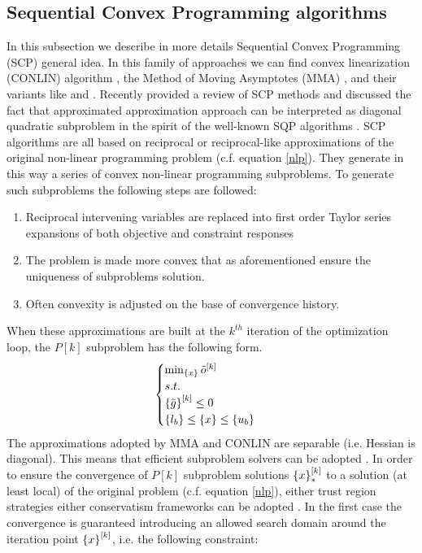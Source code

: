 \subsection{Sequential Convex Programming algorithms}
In this subsection we describe in more details Sequential Convex Programming (SCP) \cite{fleury1993mathematical,zillober2004very,duysinx2009solution} general idea. In this family of approaches we can find convex linearization (CONLIN) algorithm \cite{fleury1986structural}, the Method of Moving Asymptotes (MMA) \cite{svanberg1987method,svanberg2002class}, and their variants like \cite{borrvall2001large,bruyneel2002family} and \cite{zillober2004very}.
Recently \cite{etman2012first} provided a review of SCP methods and discussed the fact that approximated approximation approach \cite{groenwold2010approximated} can be interpreted as diagonal quadratic subproblem in the spirit of the well-known SQP algorithms \cite{nocedal2006sequential}.
SCP algorithms are all based on reciprocal or reciprocal-like approximations of the original non-linear programming problem (c.f. equation \eqref{nlp}). They generate in this way  a series of convex non-linear programming subproblems. To generate such subproblems the following steps are followed:
\begin{enumerate}
\item Reciprocal intervening variables are replaced into first order Taylor series expansions of both objective and constraint responses 
\item The problem is made more convex that as aforementioned ensure the uniqueness of subproblems solution.
\item Often convexity is adjusted on the base of convergence history.
\end{enumerate}
When these approximations are built at the $k^{th}$ iteration of the optimization loop, the $P[k]$ subproblem has the following form.
\begin{equation}
\begin{cases}
\min_{\left\lbrace{x}\right \rbrace} \tilde{o}^{[k]}\\
s.t.\\
\left\lbrace{\tilde{g}}\right \rbrace^{[k]}\leq 0\\
\left\lbrace{l_b}\right \rbrace\leq \left\lbrace{x}\right \rbrace\leq \left\lbrace{u_b}\right \rbrace
\end{cases}
\end{equation}
The approximations adopted by MMA and CONLIN are separable (i.e. Hessian is diagonal). This means that efficient subproblem solvers can be adopted \cite{falk1967lagrange,fleury1979structural}. In order to ensure the convergence of $P[k]$ subproblem solutions $\left\lbrace{x}\right \rbrace^{[k]}_*$ to a solution (at least local) of the original problem (c.f. equation \ref{nlp}), either trust region \cite{alexandrov1998trust} strategies either conservatism frameworks \cite{svanberg2002class} can be adopted \cite{etman2012first}. In the first case the convergence is guaranteed introducing an allowed search domain around the iteration point $\left\lbrace{x}\right \rbrace^{[k]}$, i.e. the following constraint: 
